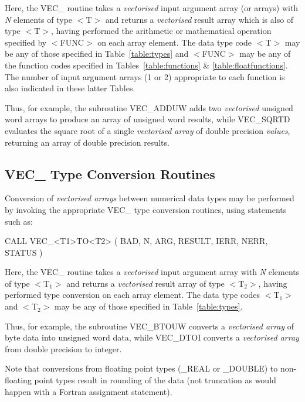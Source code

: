 \documentclass[11pt,nolof]{starlink}
\providecommand{\name}[1]{\mbox{#1}}
\providecommand{\fortvar}[1]{\mbox{\emph{#1}}}
\begin{document}
Here, the \name{VEC\_} routine takes a \emph{vectorised} input argument array
(or arrays) with \fortvar{N} elements of type \name{$<$T$>$} and returns a \emph{vectorised} result array which is also of type \name{$<$T$>$}, having performed
the arithmetic or mathematical operation specified by \name{$<$FUNC$>$} on
each array element.
The data type code \name{$<$T$>$} may be any of those specified in
Table~\ref{table:types} and \name{$<$FUNC$>$} may be any of the function
codes specified in Tables~\ref{table:functions} \&
\ref{table:floatfunctions}.
The number of input argument arrays (1 or 2) appropriate to each function is
also indicated in these latter Tables.

Thus, for example, the subroutine \name{VEC\_ADDUW} adds two \emph{vectorised}
unsigned word arrays to produce an array of unsigned word results, while
\name{VEC\_SQRTD} evaluates the square root of a single \emph{vectorised
array} of double precision \emph{values}, returning an array of double
precision results.

\subsection{\name{VEC\_} Type Conversion Routines}

Conversion of \emph{vectorised arrays} between numerical data types may be
performed by invoking the appropriate \name{VEC\_} type conversion routines,
using statements such as:

\begin{terminalv}
CALL VEC_<T1>TO<T2> ( BAD, N, ARG, RESULT, IERR, NERR, STATUS )
\end{terminalv}

Here, the \name{VEC\_} routine takes a \emph{vectorised} input argument array
with \fortvar{N} elements of type \name{$<$T$_{1}>$} and returns a \emph{vectorised} result array of type \name{$<$T$_{2}>$}, having performed type
conversion on each array element.
The data type codes \name{$<$T$_{1}>$} and \name{$<$T$_{2}>$} may be any of
those specified in Table~\ref{table:types}.

Thus, for example, the subroutine \name{VEC\_BTOUW} converts a \emph{vectorised array} of byte data into unsigned word data, while
\name{VEC\_DTOI} converts a \emph{vectorised array} from double precision to
integer.

Note that conversions from floating point types (\name{\_REAL} or
\name{\_DOUBLE}) to non-floating point types result in rounding of the data
(not truncation as would happen with a Fortran assignment statement).
\end{document}
